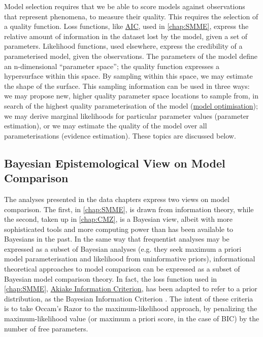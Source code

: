 \documentclass{ut-thesis}
\begin{document}
\begin{NoHyper}
Model selection requires that we be able to score models against observations that represent phenomena, to measure their quality. This requires the selection of a quality function. Loss functions, like \hyperref[ssec:AIC]{AIC}, used in \autoref{chap:SMME}, express the relative amount of information in the dataset lost by the model, given a set of parameters. Likelihood functions, used elsewhere, express the credibility of a parameterised model, given the observations. The parameters of the model define an n-dimensional ``parameter space''; the quality function expresses a hypersurface within this space. By sampling within this space, we may estimate the shape of the surface. This sampling information can be used in three ways: we may propose new, higher quality parameter space locations to sample from, in search of the highest quality parameterisation of the model (\hyperref[ssec:MLE]{model optimisation}); we may derive marginal likelihoods for particular parameter values (parameter estimation), or we may estimate the quality of the model over all parameterisations (evidence estimation). These topics are discussed below.

\subsection{Bayesian Epistemological View on Model Comparison}
\label{ssec:BayesEpistemology}
The analyses presented in the data chapters express two views on  model comparison. The first, in \autoref{chap:SMME}, is drawn from information theory, while the second, taken up in \autoref{chap:CMZ}, is a Bayesian view, albeit with more sophisticated tools and more computing power than has been available to Bayesians in the past. In the same way that frequentist analyses may be expressed as a subset of Bayesian analyses (e.g. they seek maximum a priori model parameterisation and likelihood from uninformative priors), informational theoretical approaches to model comparison can be expressed as a subset of Bayesian model comparison theory. In fact, the loss function used in \autoref{chap:SMME}, \hyperref[ssec:AIC]{Akiake Information Criterion}, has been adapted to refer to a prior distribution, as the Bayesian Information Criterion \cite{Posada2004}. The intent of these criteria is to take Occam's Razor to the maximum-likelihood approach, by penalizing the maximum-likelihood value (or maximum a priori score, in the case of BIC) by the number of free parameters.


\end{NoHyper}
\end{document}
